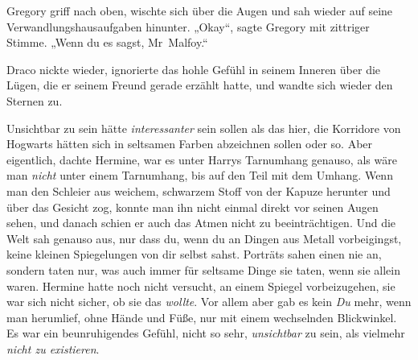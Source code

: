 Gregory griff nach oben, wischte sich über die Augen und sah wieder auf seine Verwandlungshausaufgaben hinunter.
„Okay“, sagte Gregory mit zittriger Stimme.
„Wenn du es sagst, Mr~Malfoy.“

Draco nickte wieder, ignorierte das hohle Gefühl in seinem Inneren über die Lügen, die er seinem Freund gerade erzählt hatte, und wandte sich wieder den Sternen zu.


Unsichtbar zu sein hätte \emph{interessanter} sein sollen als das hier, die Korridore von Hogwarts hätten sich in seltsamen Farben abzeichnen sollen oder so. Aber eigentlich, dachte Hermine, war es unter Harrys Tarnumhang genauso, als wäre man \emph{nicht} unter einem Tarnumhang, bis auf den Teil mit dem Umhang. Wenn man den Schleier aus weichem, schwarzem Stoff von der Kapuze herunter und über das Gesicht zog, konnte man ihn nicht einmal direkt vor seinen Augen sehen, und danach schien er auch das Atmen nicht zu beeinträchtigen. Und die Welt sah genauso aus, nur dass du, wenn du an Dingen aus Metall vorbeigingst, keine kleinen Spiegelungen von dir selbst sahst. Porträts sahen einen nie an, sondern taten nur, was auch immer für seltsame Dinge sie taten, wenn sie allein waren. Hermine hatte noch nicht versucht, an einem Spiegel vorbeizugehen, sie war sich nicht sicher, ob sie das \emph{wollte}. Vor allem aber gab es kein \emph{Du} mehr, wenn man herumlief, ohne Hände und Füße, nur mit einem wechselnden Blickwinkel. Es war ein beunruhigendes Gefühl, nicht so sehr, \emph{unsichtbar} zu sein, als vielmehr \emph{nicht zu existieren}.

